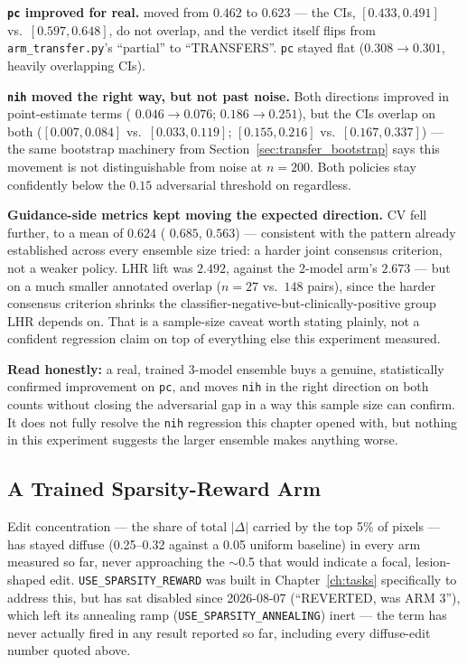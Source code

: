 \textbf{\texttt{pc} improved for real.} \ntop{} moved from $0.462$ to
$0.623$ --- the CIs, $[0.433,0.491]$ vs.\ $[0.597,0.648]$, do not
overlap, and the verdict itself flips from \texttt{arm\_transfer.py}'s
``partial'' to ``TRANSFERS''. \texttt{pc} \pton{} stayed flat
($0.308 \to 0.301$, heavily overlapping CIs).

\textbf{\texttt{nih} moved the right way, but not past noise.} Both
directions improved in point-estimate terms (\ntop{}
$0.046 \to 0.076$; \pton{} $0.186 \to 0.251$), but the CIs overlap on
both ($[0.007,0.084]$ vs.\ $[0.033,0.119]$; $[0.155,0.216]$ vs.\
$[0.167,0.337]$) --- the same bootstrap machinery from
Section~\ref{sec:transfer_bootstrap} says this movement is not
distinguishable from noise at $n=200$. Both policies stay confidently
below the $0.15$ adversarial threshold on \ntop{} regardless.

\textbf{Guidance-side metrics kept moving the expected direction.} CV
fell further, to a mean of $0.624$ (\ntop{} $0.685$, \pton{} $0.563$) ---
consistent with the pattern already established across every ensemble
size tried: a harder joint consensus criterion, not a weaker policy. LHR
lift was $2.492$, against the 2-model arm's $2.673$ --- but on a much
smaller annotated overlap ($n=27$ vs.\ $148$ pairs), since the harder
consensus criterion shrinks the classifier-negative-but-clinically-positive
group LHR depends on. That is a sample-size caveat worth stating plainly,
not a confident regression claim on top of everything else this
experiment measured.

\textbf{Read honestly:} a real, trained 3-model ensemble buys a genuine,
statistically confirmed improvement on \texttt{pc}, and moves \texttt{nih}
in the right direction on both counts without closing the adversarial gap
in a way this sample size can confirm. It does not fully resolve the
\texttt{nih} regression this chapter opened with, but nothing in this
experiment suggests the larger ensemble makes anything worse.

\subsection{A Trained Sparsity-Reward Arm}
\label{sec:sparsity_arm}

Edit concentration --- the share of total $|\Delta|$ carried by the top
5\% of pixels --- has stayed diffuse (0.25--0.32 against a 0.05 uniform
baseline) in every arm measured so far, never approaching the
$\sim$0.5 that would indicate a focal, lesion-shaped edit.
\texttt{USE\_SPARSITY\_REWARD} was built in Chapter~\ref{ch:tasks}
specifically to address this, but has sat disabled since 2026-08-07
(``REVERTED, was ARM 3''), which left its annealing ramp
(\texttt{USE\_SPARSITY\_ANNEALING}) inert --- the term has never actually
fired in any result reported so far, including every diffuse-edit number
quoted above.


